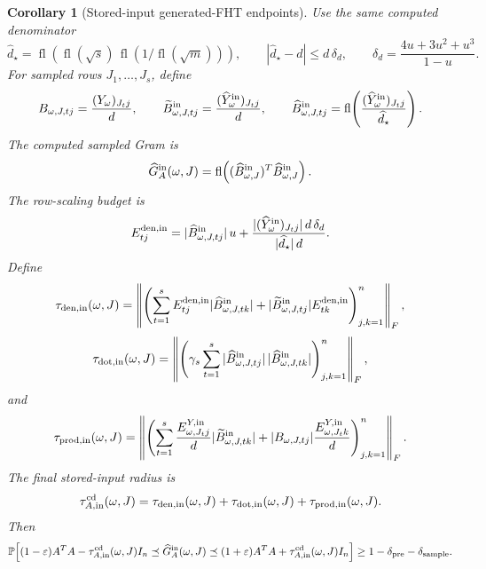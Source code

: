 \documentclass[11pt]{article}
\newcommand{\Prob}{\mathbb{P}}
\newcommand{\fl}{\operatorname{fl}}
\newcommand{\I}{I}
\newcommand{\eps}{\varepsilon}
\newtheorem{corollary}[theorem]{Corollary}
\theoremstyle{remark}
\begin{document}
\begin{corollary}[Stored-input generated-FHT endpoints]
Use the same computed denominator
\[
  \widehat d_\star
  =
  \fl\!\left(
    \fl(\sqrt{s})\,\fl(1/\fl(\sqrt m))
  \right),
  \qquad
  |\widehat d_\star-d|
  \le
  d\,\delta_d,
  \qquad
  \delta_d=\frac{4u+3u^2+u^3}{1-u}.
\]
For sampled rows \(J_1,\ldots,J_s\), define
\[
  B_{\omega,J,tj}=\frac{(Y_\omega)_{J_tj}}{d},
  \qquad
  \widetilde B^{{\rm in}}_{\omega,J,tj}
  =
  \frac{(\widehat Y^{\rm in}_\omega)_{J_tj}}{d},
  \qquad
  \widehat B^{{\rm in}}_{\omega,J,tj}
  =
  \fl\!\left(
    \frac{(\widehat Y^{\rm in}_\omega)_{J_tj}}{\widehat d_\star}
  \right).
\]
The computed sampled Gram is
\[
  \widehat G_A^{\rm in}(\omega,J)
  =
  \fl\!\left(
    (\widehat B^{{\rm in}}_{\omega,J})^T
    \widehat B^{{\rm in}}_{\omega,J}
  \right).
\]
The row-scaling budget is
\[
  E^{{\rm den},{\rm in}}_{tj}
  =
  |\widehat B^{{\rm in}}_{\omega,J,tj}|\,u
  +
  \frac{|(\widehat Y^{\rm in}_\omega)_{J_tj}|\,d\,\delta_d}
       {|\widehat d_\star|\,d}.
\]
Define
\[
  \tau_{{\rm den},{\rm in}}(\omega,J)
  =
  \left\|
    \left(
      \sum_{t=1}^s
      E^{{\rm den},{\rm in}}_{tj}
      |\widehat B^{{\rm in}}_{\omega,J,tk}|
      +
      |\widetilde B^{{\rm in}}_{\omega,J,tj}|
      E^{{\rm den},{\rm in}}_{tk}
    \right)_{j,k=1}^n
  \right\|_F,
\]
\[
  \tau_{{\rm dot},{\rm in}}(\omega,J)
  =
  \left\|
    \left(
      \gamma_s
      \sum_{t=1}^s
      |\widehat B^{{\rm in}}_{\omega,J,tj}|\,
      |\widehat B^{{\rm in}}_{\omega,J,tk}|
    \right)_{j,k=1}^n
  \right\|_F,
\]
and
\[
  \tau_{{\rm prod},{\rm in}}(\omega,J)
  =
  \left\|
    \left(
      \sum_{t=1}^s
      \frac{E^{Y,{\rm in}}_{\omega,J_tj}}{d}
        |\widetilde B^{{\rm in}}_{\omega,J,tk}|
      +
      |B_{\omega,J,tj}|
      \frac{E^{Y,{\rm in}}_{\omega,J_tk}}{d}
    \right)_{j,k=1}^n
  \right\|_F .
\]
The final stored-input radius is
\[
  \tau_{A,{\rm in}}^{\rm cd}(\omega,J)
  =
  \tau_{{\rm den},{\rm in}}(\omega,J)
  +
  \tau_{{\rm dot},{\rm in}}(\omega,J)
  +
  \tau_{{\rm prod},{\rm in}}(\omega,J).
\]
Then
\[
  \Prob\!\left[
    (1-\eps)A^TA-\tau_{A,{\rm in}}^{\rm cd}(\omega,J)\I_n
    \preceq
    \widehat G_A^{\rm in}(\omega,J)
    \preceq
    (1+\eps)A^TA+\tau_{A,{\rm in}}^{\rm cd}(\omega,J)\I_n
  \right]
  \ge
  1-\delta_{\rm pre}-\delta_{\rm sample}.
\]


\end{corollary}
\end{document}
